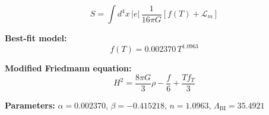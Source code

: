 
\begin{equation}
  S = \int d^4x \, |e| \, \frac{1}{16\pi G} \left[ f(T) + \mathcal{L}_m \right]
\end{equation}

\textbf{Best-fit model:}
\begin{equation}
  f(T) = 0.002370 \, T^{1.0963}
\end{equation}

\textbf{Modified Friedmann equation:}
\begin{equation}
  H^2 = \frac{8\pi G}{3} \rho - \frac{f}{6} + \frac{T f_T}{3}
\end{equation}

\textbf{Parameters:}
$\alpha = 0.002370$, \quad
$\beta = -0.415218$, \quad
$n = 1.0963$, \quad
$\Lambda_{\text{BI}} = 35.4921$